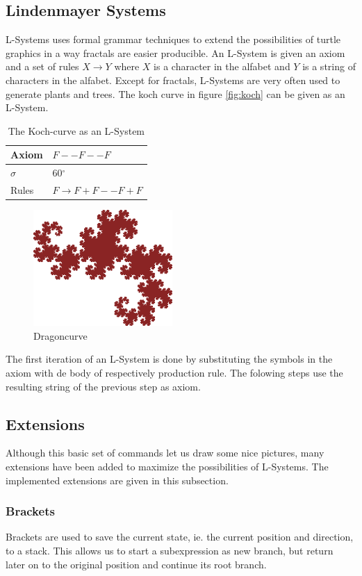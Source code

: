\documentclass[11pt,a4paper]{article}
\newcommand{\degree}{\ensuremath{^\circ}}
\begin{document}
\subsection{Lindenmayer Systems}
L-Systems uses formal grammar techniques to extend the possibilities of turtle graphics in a way fractals are easier producible. An L-System is given an axiom and a set of rules $X \rightarrow Y$ where $X$ is a character in the alfabet and $Y$ is a string of characters in the alfabet. Except for fractals, L-Systems are very often used to generate plants and trees. The koch curve in figure \ref{fig:koch} can be given as an L-System.

\begin{table}
\center
\begin{tabular}{l l}
Axiom & $F--F--F$ \\ \hline
$\sigma$ & 60\degree \\ \hline
Rules & $F \rightarrow F+F--F+F$ \\
\end{tabular}
\caption{The Koch-curve as an L-System}
\end{table}

\begin{figure}[h!]
  \centering
  \includegraphics[]{dragon.png}
  \caption{Dragoncurve}
  \label{fig:dragon}
\end{figure}

The first iteration of an L-System is done by substituting the symbols in the axiom with de body of respectively production rule. The folowing steps use the resulting string of the previous step as axiom.

\subsection{Extensions}
Although this basic set of commands let us draw some nice pictures, many extensions have been added to maximize the possibilities of L-Systems. The implemented extensions are given in this subsection.

\subsubsection{Brackets}
Brackets are used to save the current state, ie. the current position and direction, to a stack. This allows us to start a subexpression as new branch, but return later on to the original position and continue its root branch.
\end{document}
